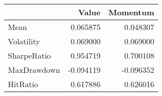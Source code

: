 \begin{tabular}{lrr}
\toprule
{} &     Value &  Momentum \\
\midrule
Mean        &  0.065875 &  0.048307 \\
Volatility  &  0.069000 &  0.069000 \\
SharpeRatio &  0.954719 &  0.700108 \\
MaxDrawdown & -0.094119 & -0.096352 \\
HitRatio    &  0.617886 &  0.626016 \\
\bottomrule
\end{tabular}
